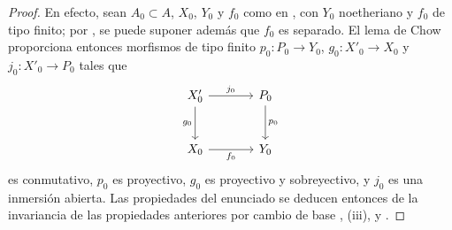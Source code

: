 \begin{proof}
En efecto, sean $A_0\subset A$, $X_0$, $Y_0$ y $f_0$ como en , con $Y_0$ noetheriano y $f_0$ de tipo finito; por , se puede suponer además que $f_0$ es separado. El lema de Chow  proporciona entonces morfismos de tipo finito $p_0:P_0\to Y_0$, $g_0:X'_0\to X_0$ y $j_0:X'_0\to P_0$ tales que
\[
\begin{tikzcd}[column sep=large,row sep=large]
X'_0 \arrow[r,"j_0"] \arrow[d,"g_0"'] & P_0 \arrow[d,"p_0"] \\
X_0 \arrow[r,"f_0"'] & Y_0
\end{tikzcd}
\]
es conmutativo, $p_0$ es proyectivo, $g_0$ es proyectivo y sobreyectivo, y $j_0$ es una inmersión abierta. Las propiedades del enunciado se deducen entonces de la invariancia de las propiedades anteriores por cambio de base , (iii),  y .
\end{proof}

